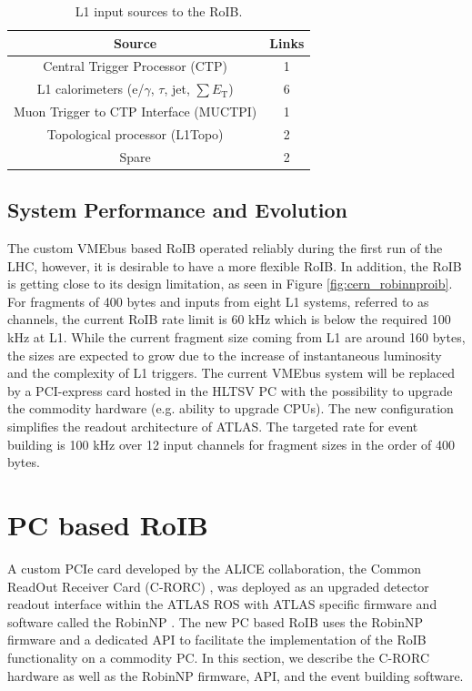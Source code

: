 \begin{table}[tbp]
\caption{L1 input sources to the RoIB.}
\label{tab:roib_links}
\smallskip
\centering
\begin{tabular}{|c|c|}
\hline
Source & Links\\
\hline
Central Trigger Processor (CTP)  & 1  \\
L1 calorimeters (e/$\gamma$, $\tau$, jet, $\sum E_\mathrm{T}$) & 6  \\
Muon Trigger to CTP Interface (MUCTPI) & 1  \\
Topological processor (L1Topo) & 2  \\
Spare & 2 \\
\hline
\end{tabular}
\end{table}

\subsection{System Performance and Evolution}\label{sec:roib_limit}

The custom VMEbus based RoIB operated reliably during the first run of the LHC, however, it is desirable to have a more flexible RoIB. 
In addition, the RoIB is getting close to its design limitation, as seen 
in Figure \ref{fig:cern_robinnproib}. For fragments of 400 bytes and inputs from eight L1 systems, referred to as channels, the current RoIB rate limit is 60 kHz which is below the required 100 kHz at 
L1. While the current fragment size coming from L1 are around 160 bytes, the sizes are expected to grow due to the increase of instantaneous 
luminosity and the complexity of L1 triggers. The current VMEbus system will be replaced by a PCI-express card hosted in the HLTSV PC with the 
possibility to upgrade the commodity hardware (e.g. ability to upgrade CPUs). 
The new configuration simplifies the readout architecture of ATLAS. The targeted rate for event building is 100 kHz over 12 input channels for 
fragment sizes in the order of 400 bytes.

\section{PC based RoIB}\label{sec:roib_new}

 A custom PCIe card developed by the ALICE collaboration, the Common ReadOut Receiver Card (C-RORC) \cite{alice}, was deployed as an 
upgraded detector readout interface within the ATLAS ROS with ATLAS specific firmware and software called the RobinNP \cite{crorc}. 
The new PC based RoIB uses the RobinNP firmware and a dedicated API to facilitate the implementation of the RoIB functionality 
on a commodity PC. In this section, we describe the C-RORC hardware as well as the RobinNP firmware, API, and the event building software. 
